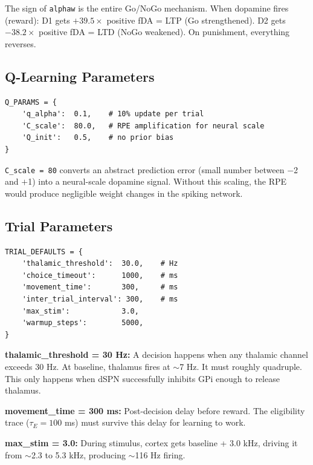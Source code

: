 \documentclass[11pt,a4paper]{article}
\begin{document}
The sign of \texttt{alphaw} is the entire Go/NoGo mechanism. When dopamine fires (reward): D1 gets $+39.5 \times$ positive fDA = LTP (Go strengthened). D2 gets $-38.2 \times$ positive fDA = LTD (NoGo weakened). On punishment, everything reverses.

\subsection{Q-Learning Parameters}

\begin{lstlisting}
Q_PARAMS = {
    'q_alpha':  0.1,    # 10% update per trial
    'C_scale':  80.0,   # RPE amplification for neural scale
    'Q_init':   0.5,    # no prior bias
}
\end{lstlisting}

\texttt{C\_scale = 80} converts an abstract prediction error (small number between $-$2 and $+$1) into a neural-scale dopamine signal. Without this scaling, the RPE would produce negligible weight changes in the spiking network.

\subsection{Trial Parameters}

\begin{lstlisting}
TRIAL_DEFAULTS = {
    'thalamic_threshold':  30.0,    # Hz
    'choice_timeout':      1000,    # ms
    'movement_time':       300,     # ms
    'inter_trial_interval': 300,    # ms
    'max_stim':            3.0,
    'warmup_steps':        5000,
}
\end{lstlisting}

\textbf{thalamic\_threshold = 30 Hz:} A decision happens when any thalamic channel exceeds 30 Hz. At baseline, thalamus fires at $\sim$7 Hz. It must roughly quadruple. This only happens when dSPN successfully inhibits GPi enough to release thalamus.

\textbf{movement\_time = 300 ms:} Post-decision delay before reward. The eligibility trace ($\tau_E = 100$ ms) must survive this delay for learning to work.

\textbf{max\_stim = 3.0:} During stimulus, cortex gets baseline + 3.0 kHz, driving it from $\sim$2.3 to 5.3 kHz, producing $\sim$116 Hz firing.

\newpage
\end{document}
